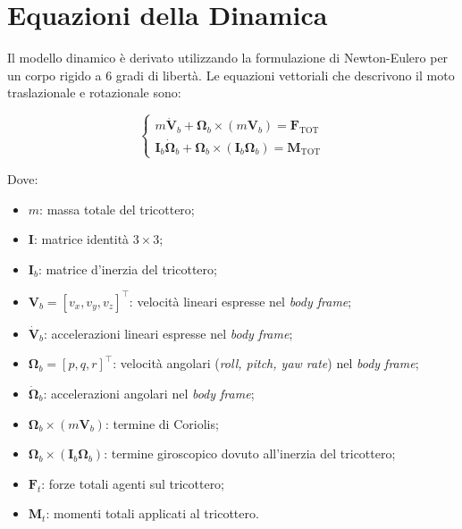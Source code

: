 
\clearpage

\section{Equazioni della Dinamica}
Il modello dinamico è derivato utilizzando la formulazione di Newton-Eulero per un corpo rigido a 6 gradi di libertà. Le equazioni vettoriali che descrivono il moto traslazionale e rotazionale sono:

\begin{equation}
    \begin{cases}
        m \bm{\dot{V}}_b + \bm{\Omega}_b \times (m \bm{V}_b) = \bm{F}_{\text{TOT}} \\
        \bm{I}_b \bm{\dot{\Omega}}_b + \bm{\Omega}_b \times (\bm{I}_b \bm{\Omega}_b) = \bm{M}_{\text{TOT}}
    \end{cases}
    \label{eq:newton_euler}
\end{equation}

Dove:
\begin{itemize}
    \item $m$: massa totale del tricottero;
    \item $\bm{I}$: matrice identità $3 \times 3$;
    \item $\bm{I}_b$: matrice d'inerzia del tricottero;
    \item $\bm{V}_b = [v_x, v_y, v_z]^\top$: velocità lineari espresse nel \textit{body frame};
    \item $\dot{\bm{V}}_b$: accelerazioni lineari espresse nel \textit{body frame};
    \item $\bm{\Omega}_b = [p, q, r]^\top$: velocità angolari (\textit{roll, pitch, yaw rate}) nel \textit{body frame};
    \item $\dot{\bm{\Omega}}_b$: accelerazioni angolari nel \textit{body frame};
    \item $\bm{\Omega}_b \times (m\bm{V}_b)$: termine di Coriolis;
    \item $\bm{\Omega}_b \times (\bm{I}_b\bm{\Omega}_b)$: termine giroscopico dovuto all'inerzia del tricottero;
    \item $\bm{F}_t$: forze totali agenti sul tricottero;
    \item $\bm{M}_t$: momenti totali applicati al tricottero.
\end{itemize}
\clearpage


